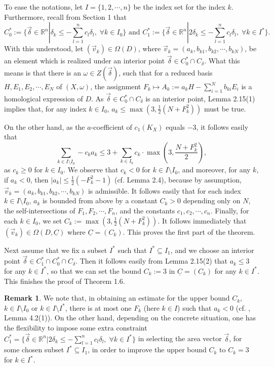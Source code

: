 \documentclass[11pt]{amsart}
\theoremstyle{plain}
\numberwithin{theorem}{section}
\theoremstyle{definition}
\newtheorem{remark}[theorem]{Remark}
\newcommand{\R}{{\mathbb R}}
\begin{document}
\vspace{2mm}

To ease the notations, let $I=\{1,2,\cdots,n\}$ be the index set for the index $k$. Furthermore, recall from Section 1 that
$$
C^\ast_0:=\{\vec{\delta}\in \R^n| \delta_k \leq -\sum_{l=1}^n c_l\delta_l, \; \forall k\in I_0\} 
\mbox{ and }
C^\ast_1:=\{\vec{\delta}\in \R^n| 2 \delta_k \leq -\sum_{l=1}^n c_l\delta_l, \; \forall k\in I^\ast\}.
$$
With this understood, 
let $(\vec{v}_k)\in \Omega(D)$, where $\vec{v}_k=(a_k, b_{k1}, b_{k2}, \cdots, b_{kN})$, be an element which is realized under an interior point $\vec{\delta}\in C^\ast_0 \cap C_\delta$. What this means is that there is
an $\omega\in Z(\vec{\delta})$, such that for a reduced basis $H,E_1,E_2,\cdots,E_N$ of $(X,\omega)$, the assignment $F_k\mapsto A_k:=a_kH-\sum_{i=1}^N b_{ki}E_i$ is a homological expression of $D$. 
As $\vec{\delta}\in C^\ast_0 \cap C_\delta$ is an interior point, Lemma 2.15(1) implies that, for any index $k\in I_0$, $a_k\leq \max(3, \frac{1}{2}(N+F_k^2))$ must be true. 

On the other hand, as the $a$-coefficient of $c_1(K_X)$ equals $-3$, it follows easily that
$$
\sum_{k\in I\setminus I_0} -c_k a_k\leq 3+\sum_{k\in I_0} c_k \cdot \max(3,\frac{N+F_k^2}{2}),
$$
as $c_k\geq 0$ for $k\in I_0$. We observe that $c_k<0$ for $k\in I\setminus I_0$, and moreover, 
for any $k$, if $a_k<0$, then $|a_k|\leq \frac{1}{2}(-F_k^2-1)$ (cf. Lemma 2.4), because by assumption, 
$\vec{v}_k=(a_k, b_{k1}, b_{k2}, \cdots, b_{kN})$ is admissible. It follows easily that for each index $k\in I\setminus I_0$, $a_k$ is bounded from above by a constant $C_k>0$ depending only on $N$, the self-intersections of $F_1,F_2,\cdots, F_n$, and the constants $c_1,c_2,\cdots,c_n$. Finally, for each $k\in I_0$, we set $C_k:= \max(3, \frac{1}{2}(N+F_k^2))$. It follows immediately that $(\vec{v}_k)\in \Omega(D, \underline{C})$ where $\underline{C}=(C_k)$. 
This proves the first part of the theorem. 

Next assume that we fix a subset $I^\ast$ such that $I^\ast\subseteq I_1$, and we choose an interior point 
$\vec{\delta}\in C^\ast_1\cap C^\ast_0 \cap C_\delta$. Then it follows easily from Lemma 2.15(2) that $a_k\leq 3$
for any $k\in I^\ast$, so that we can set the bound $C_k:=3$ in $\underline{C}=(C_k)$ for any $k\in I^\ast$. 
This finishes the proof of Theorem 1.6.

\begin{remark}
We note that, in obtaining an estimate for the upper bound $C_k$, $k\in I\setminus I_0$ or $k\in I\setminus I^\ast$, there is at most one $F_k$ (here $k\in I$) such that $a_k<0$ (cf. \cite{C}, Lemma 4.2(1)). On the other hand, depending on the concrete situation, one has the flexibility to impose some extra constraint 
$C^\ast_1=\{\vec{\delta}\in \R^n| 2\delta_k \leq -\sum_{l=1}^n c_l\delta_l, \; \forall k\in I^\ast\}$ in selecting the area
vector $\vec{\delta}$, for some chosen subset $I^\ast\subseteq I_1$, in order to improve the upper bound $C_k$ to $C_k=3$ for $k\in I^\ast$.
\end{remark}
\end{document}

